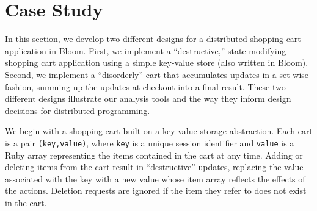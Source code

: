 \section{Case Study}
\label{sec:case}

In this section, we develop two different designs for a distributed shopping-cart
application in Bloom.  First, we implement a ``destructive,'' state-modifying
shopping cart application using a simple key-value store (also written in Bloom).
Second, we implement a ``disorderly'' cart that accumulates updates in a 
set-wise fashion, summing up the updates at checkout into a final result.  These two different designs illustrate our analysis tools and the way they inform design decisions for distributed programming.

We begin with a shopping cart built on a key-value storage abstraction.  Each
cart is a pair \texttt{(key,value)}, where \texttt{key} is a unique session
identifier and \texttt{value} is 
a Ruby array representing the items contained in the cart
at any time. Adding or deleting items from the cart result in ``destructive''
updates, replacing the value associated with the key with a new value whose
item array reflects the effects of the actions.  Deletion requests are ignored
if the item they refer to does not exist in the cart.

